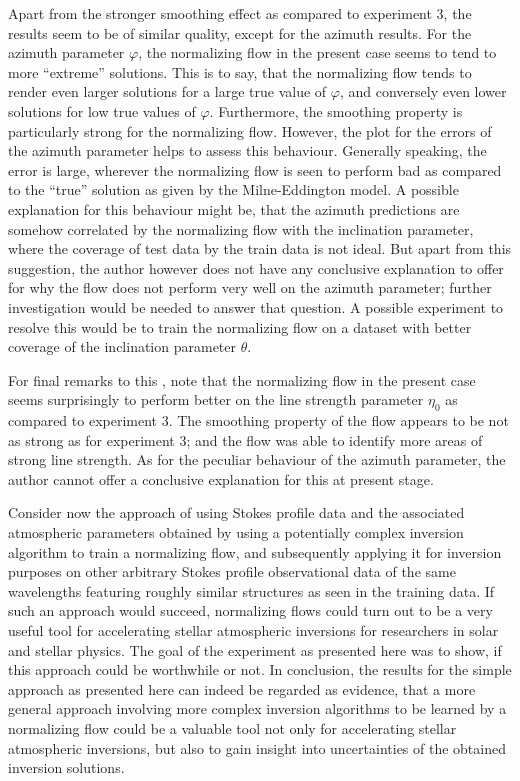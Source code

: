 \documentclass[a4paper,12pt]{report}
\def\lk#1{{\color{black}{#1}}}
\begin{document}
Apart from the stronger smoothing effect as compared to experiment 3, the results seem to be of similar quality, except for the azimuth results. For the azimuth parameter $\varphi$, the normalizing flow in the present case seems to tend to more ``extreme'' solutions. This is to say, that the normalizing flow tends to render even larger solutions for a large true value of $\varphi$, and conversely even lower solutions for low true values of $\varphi$. Furthermore, the smoothing property is particularly strong for the normalizing flow. However, the plot for the errors of the azimuth parameter helps to assess this behaviour. Generally speaking, the error is large, wherever the normalizing flow is seen to perform bad as compared to the ``true'' solution as given by the Milne-Eddington model. A possible explanation for this behaviour might be, that the azimuth predictions are somehow correlated by the normalizing flow with the inclination parameter, where the coverage of test data by the train data is not ideal. But apart from this suggestion, the author however does not have any conclusive explanation to offer for why the flow does not perform very well on the azimuth parameter; further investigation would be needed to answer that question. A possible experiment to resolve this would be to train the normalizing flow on a dataset with better coverage of the inclination parameter $\theta$.

For final remarks to this \lk{experiment}, note that the normalizing flow in the present case seems surprisingly to perform better on the line strength parameter $\eta_0$ as compared to experiment 3. The smoothing property of the flow appears to be not as strong as for experiment 3; and the flow was able to identify more areas of strong line strength. As for the peculiar behaviour of the azimuth parameter, the author cannot offer a conclusive explanation for this at present stage.

Consider now the approach of using Stokes profile data and the associated atmospheric parameters obtained by using a potentially complex inversion algorithm to train a normalizing flow, and subsequently applying it for inversion purposes on other arbitrary Stokes profile observational data of the same wavelengths featuring roughly similar structures as seen in the training data. If such an approach would succeed, normalizing flows could turn out to be a very useful tool for accelerating stellar atmospheric inversions for researchers in solar and stellar physics. The goal of the experiment as presented here was to show, if this approach could be worthwhile or not. In conclusion, the results for the simple approach as presented here can indeed be regarded as evidence, that a more general approach involving more complex inversion algorithms to be learned by a normalizing flow could be a valuable tool not only for accelerating stellar atmospheric inversions, but also to gain insight into uncertainties of the obtained inversion solutions.
\end{document}
